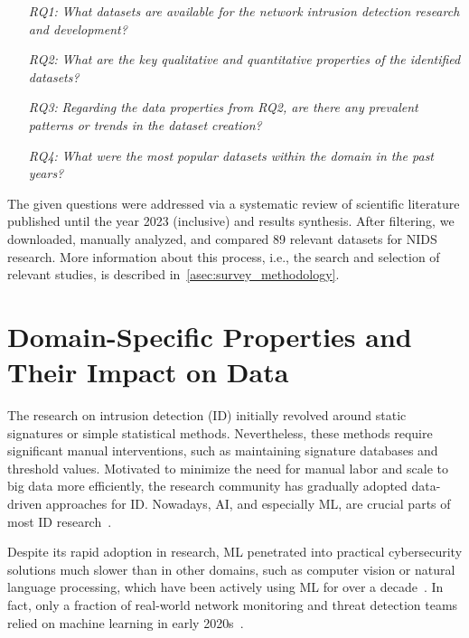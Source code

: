 \begin{enumerate}[leftmargin=1.2cm, topsep=3pt, itemsep=1pt]
    \item[\emph{RQ1:}] \emph{What datasets are available for the network intrusion detection research and development?}
    \item[\emph{RQ2:}] \emph{What are the key qualitative and quantitative properties of the identified datasets?}
    \item[\emph{RQ3:}] \emph{Regarding the data properties from RQ2, are there any prevalent patterns or trends in the dataset creation?}
    \item[\emph{RQ4:}] \emph{What were the most popular datasets within the domain in the past years?}
\end{enumerate}

The given questions were addressed via a systematic review of scientific literature published until the year 2023 (inclusive) and results synthesis. After filtering, we downloaded, manually analyzed, and compared 89 relevant datasets for NIDS research.  More information about this process, i.e., the search and selection of relevant studies, is described in~\ref{asec:survey_methodology}.


\section{Domain-Specific Properties and Their Impact on Data}
\label{sec:domain_specs}

The research on intrusion detection (ID) initially revolved around static signatures or simple statistical methods. Nevertheless, these methods require significant manual interventions, such as maintaining signature databases and threshold values. Motivated to minimize the need for manual labor and scale to big data more efficiently, the research community has gradually adopted data-driven approaches for ID. Nowadays, AI, and especially ML, are crucial parts of most ID research~\cite{apruzzese2023_role_of_ml_cybersec}.

Despite its rapid adoption in research, ML penetrated into practical cybersecurity solutions much slower than in other domains, such as computer vision or natural language processing, which have been actively using ML for over a decade~\cite{apruzzese2023_role_of_ml_cybersec}. In fact, only a fraction of real-world network monitoring and threat detection teams relied on machine learning in early 2020s~\cite{alahmadi2022_99fp_study_soc_alarms}.

